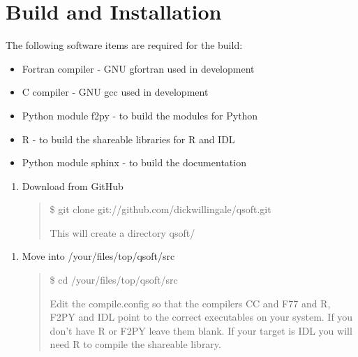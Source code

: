 \documentclass[letterpaper,10pt,english]{sphinxmanual}
\begin{document}
\chapter{Build and Installation}
\label{\detokenize{installation:build-and-installation}}\label{\detokenize{installation::doc}}
The following software items are required for the build:
\begin{itemize}
\item {} 
Fortran compiler - GNU gfortran used in development

\item {} 
C compiler - GNU gcc used in development

\item {} 
Python module f2py - to build the modules for Python

\item {} 
R - to build the shareable libraries for R and IDL

\item {} 
Python module sphinx - to build the documentation

\end{itemize}
\begin{enumerate}
\def\theenumi{\arabic{enumi}}
\def\labelenumi{\theenumi .}
\makeatletter\def\p@enumii{\p@enumi \theenumi .}\makeatother
\item {} 
Download from GitHub
\begin{quote}

\$ git clone git://github.com/dickwillingale/qsoft.git

This will create a directory qsoft/
\end{quote}

\end{enumerate}
\begin{enumerate}
\def\theenumi{\arabic{enumi}}
\def\labelenumi{\theenumi )}
\makeatletter\def\p@enumii{\p@enumi \theenumi )}\makeatother
\setcounter{enumi}{1}
\item {} 
Move into /your/files/top/qsoft/src
\begin{quote}

\$ cd /your/files/top/qsoft/src

Edit the compile.config so that the compilers CC and F77 and R, F2PY and IDL
point to the correct executables on your system.
If you don’t have R or F2PY leave them blank. If your target is IDL you will
need R to compile the shareable library.
\end{quote}

\end{enumerate}
\end{document}

